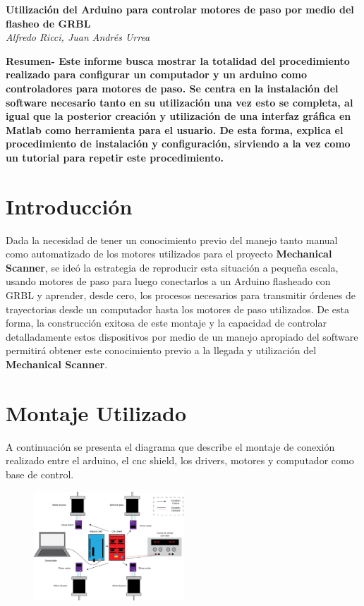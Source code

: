 \documentclass{article}
\begin{document}
\begin{center}
{\Large \textbf{Utilización del Arduino para controlar motores de paso por medio del flasheo de GRBL}}\\
\vspace{0.3cm}
\textit{Alfredo Ricci, Juan Andrés Urrea}
\end{center}
\begin{multicols}{2}
\textbf{Resumen- Este informe busca mostrar la totalidad del procedimiento realizado para configurar un computador y un arduino como controladores para motores de paso. Se centra en la instalación del software necesario tanto en su utilización una vez esto se completa, al igual que la posterior creación y utilización de una interfaz gráfica en Matlab como herramienta para el usuario. De esta forma, explica el procedimiento de instalación y configuración, sirviendo a la vez como un tutorial para repetir este procedimiento.}

{\centering \section{Introducción}}
Dada la necesidad de tener un conocimiento previo del manejo tanto manual como automatizado de los motores utilizados para el proyecto \textbf{Mechanical Scanner}, se ideó la estrategia de reproducir esta situación a pequeña escala, usando motores de paso para luego conectarlos a un Arduino flasheado con GRBL y aprender, desde cero, los procesos necesarios para transmitir órdenes de trayectorias desde un computador hasta los motores de paso utilizados. De esta forma, la construcción exitosa de este montaje y la capacidad de controlar detalladamente estos dispositivos por medio de un manejo apropiado del software permitirá obtener este conocimiento previo a la llegada y utilización del \textbf{Mechanical Scanner}.

{\centering \section{Montaje Utilizado}}
A continuación se presenta el diagrama que describe el montaje de conexión realizado entre el arduino, el cnc shield, los drivers, motores y computador como base de control.

\begin{figure}[H]
\centering
\includegraphics[width=0.5\textwidth]{Montaje.png}
\label{fig:montaje}
\end{figure}


\end{multicols}
\end{document}
